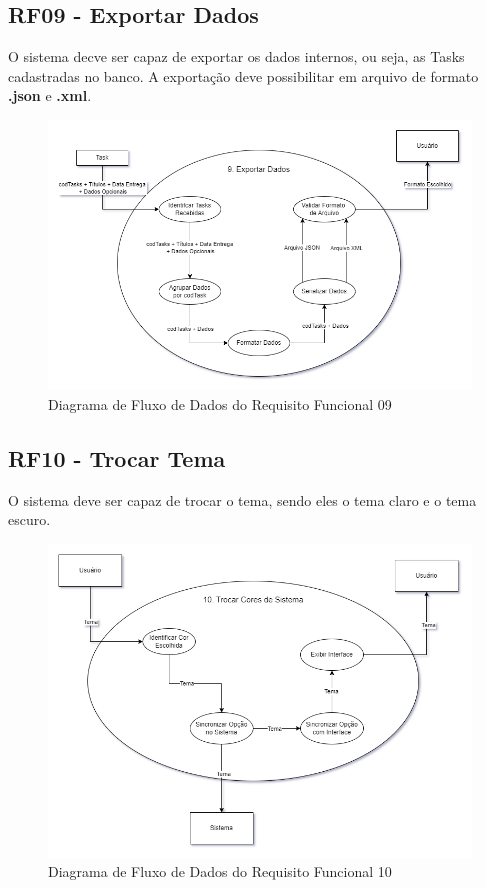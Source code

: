 \documentclass[a4paper,12pt]{article}
\begin{document}
\pagebreak
\subsection{RF09 - Exportar Dados}
O sistema decve ser capaz de exportar os dados internos, ou seja, as Tasks cadastradas no banco. A exportação deve possibilitar em arquivo de formato \textbf{.json} e \textbf{.xml}.
\begin{figure}[H]
	\centering
	\includegraphics[scale=0.45]{DFDs/RF09.drawio.png}
	\caption{Diagrama de Fluxo de Dados do Requisito Funcional 09}
\end{figure}

\pagebreak
\subsection{RF10 - Trocar Tema}
O sistema deve ser capaz de trocar o tema, sendo eles o tema claro e o tema escuro.
\begin{figure}[H]
	\centering
	\includegraphics[scale=0.45]{DFDs/RF10.drawio.png}
	\caption{Diagrama de Fluxo de Dados do Requisito Funcional 10}
\end{figure}
\end{document}
